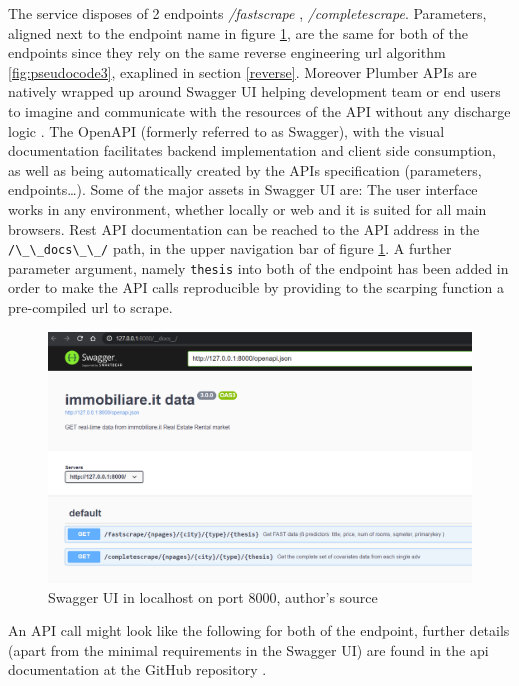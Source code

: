 \documentclass[
  12pt,
  a4paper,
  oneside]{book}
\newcommand{\passthrough}[1]{#1}
\theoremstyle{definition}
\theoremstyle{definition}
\theoremstyle{definition}
\theoremstyle{remark}
\begin{document}
The service disposes of 2 endpoints \emph{/fastscrape} , \emph{/completescrape}. Parameters, aligned next to the endpoint name in figure \ref{fig:swagger}, are the same for both of the endpoints since they rely on the same reverse engineering url algorithm \ref{fig:pseudocode3}, exaplined in section \ref{reverse}. Moreover Plumber APIs are natively wrapped up around Swagger UI helping development team or end users to imagine and communicate with the resources of the API without any discharge logic \citep{swaggerUI}. The OpenAPI (formerly referred to as Swagger), with the visual documentation facilitates backend implementation and client side consumption, as well as being automatically created by the APIs specification (parameters, endpoints\ldots). Some of the major assets in Swagger UI are: The user interface works in any environment, whether locally or web and it is suited for all main browsers.
Rest API documentation can be reached to the API address in the \passthrough{\lstinline!/\_\_docs\_\_/!} path, in the upper navigation bar of figure \ref{fig:swagger}. A further parameter argument, namely \passthrough{\lstinline!thesis!} into both of the endpoint has been added in order to make the API calls reproducible by providing to the scarping function a pre-compiled url to scrape.

\begin{figure}
\centering
\includegraphics{images/swagger.PNG}
\caption{\label{fig:swagger}Swagger UI in localhost on port 8000, author's source}
\end{figure}

An API call might look like the following for both of the endpoint, further details (apart from the minimal requirements in the Swagger UI) are found in the api documentation at the GitHub repository \citet{NiccoloS11}.
\end{document}
